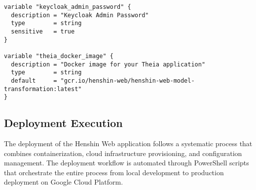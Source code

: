 \begin{lstlisting}[language=hcl, caption=Variable Configuration]
variable "keycloak_admin_password" {
  description = "Keycloak Admin Password"
  type        = string
  sensitive   = true
}

variable "theia_docker_image" {
  description = "Docker image for your Theia application"
  type        = string
  default     = "gcr.io/henshin-web/henshin-web-model-transformation:latest"
}
\end{lstlisting}





\subsection{Deployment Execution}
\label{subsec:deployment-execution}

The deployment of the Henshin Web application follows a systematic process that combines containerization, cloud infrastructure provisioning, and configuration management. The deployment workflow is automated through PowerShell scripts that orchestrate the entire process from local development to production deployment on Google Cloud Platform.

